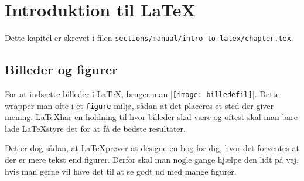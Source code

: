 \chapter{Introduktion til \LaTeX}
Dette kapitel er skrevet i filen 
\texttt{sections/manual/intro-to-latex/chapter.tex}.

\vspace{5mm}

\section{Billeder og figurer}

For at indsætte billeder i \LaTeX, bruger man 
\LaTeXInline|\texttt{[image: billedefil]}|. Dette wrapper man ofte i 
et \texttt{figure} miljø, sådan at det placeres et sted der giver mening. 
\LaTeX har en holdning til hvor billeder skal være og oftest skal man bare lade 
\LaTeX styre det for at få de bedste resultater. 

Det er dog sådan, at \LaTeX prøver at designe en bog for dig, hvor det 
forventes at der er mere tekst end figurer. Derfor skal man nogle gange hjælpe 
den lidt på vej, hvis man gerne vil have det til at se godt ud med mange 
figurer.

\begin{figure}[H]
\end{figure}